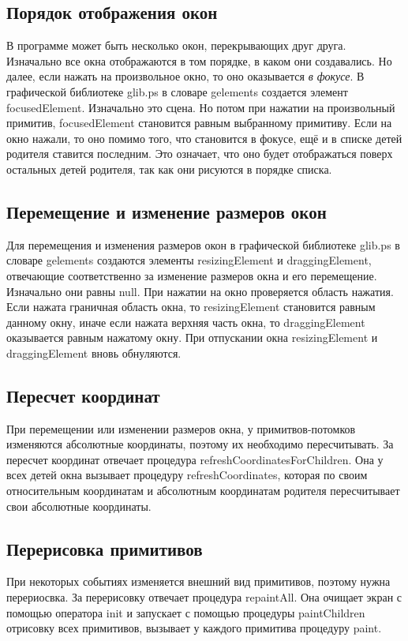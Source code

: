 \documentclass[14pt]{extarticle}
\begin{document}
	\subsection{Порядок отображения окон}
	В программе может быть несколько окон, перекрывающих друг друга. Изначально все окна отображаются в том порядке, в каком они создавались. Но далее, если нажать на произвольное окно, то оно оказывается \textit{в фокусе}. В графической библиотеке glib.ps в словаре gelements создается элемент focusedElement. Изначально это сцена. Но потом при нажатии на произвольный примитив, \linebreak focusedElement становится равным выбранному примитиву. Если на окно нажали, то оно помимо того, что становится в фокусе, ещё и в списке детей родителя ставится последним. Это означает, что оно будет отображаться поверх остальных детей родителя, так как они рисуются в порядке списка.
	
	\subsection{Перемещение и изменение размеров окон}
	Для перемещения и изменения размеров окон в графической библиотеке glib.ps в словаре gelements создаются элементы resizingElement и  draggingElement, отвечающие соответственно за изменение размеров окна и  его перемещение. Изначально они равны null. При нажатии на окно проверяется область нажатия. Если нажата граничная область окна, то resizingElement становится равным данному окну, иначе если нажата верхняя часть окна, то draggingElement оказывается равным нажатому окну. При отпускании окна resizingElement и draggingElement вновь обнуляются.
	
	\subsection{Пересчет координат}
При перемещении или изменении размеров окна, у примитвов-потомков изменяются абсолютные координаты, поэтому их необходимо пересчитывать. За пересчет координат отвечает процедура refreshCoordinatesForChildren. Она у всех детей окна вызывает процедуру refreshCoordinates, которая по своим относительным координатам и абсолютным координатам родителя пересчитывает свои абсолютные координаты. 

\subsection{Перерисовка примитивов}
При некоторых событиях изменяется внешний вид примитивов, поэтому нужна перериосвка. За перерисовку отвечает процедура repaintAll. Она очищает экран с помощью оператора init и запускает с помощью процедуры paintChildren отрисовку всех примитивов, вызывает у каждого примитива процедуру paint. 
		
\end{document}
